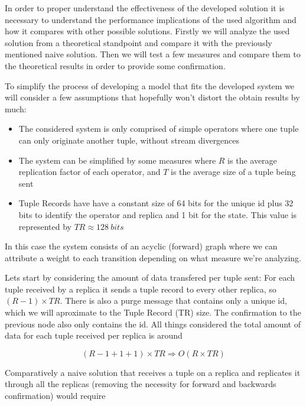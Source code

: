 \documentclass[times, 10pt,twocolumn]{article}
\begin{document}

In order to proper understand the effectiveness of the developed solution
it is necessary to understand the performance implications of the used
algorithm and how it compares with other possible solutions. Firstly we
will analyze the used solution from a theoretical standpoint and compare
it with the previously mentioned naive solution. Then we will test a few measures
and compare them to the theoretical results in order to provide some
confirmation.


To simplify the process of developing a model that fits the developed
system we will consider a few assumptions that hopefully won't distort the
obtain results by much:
\begin{itemize}
	\item The considered system is only comprised of simple operators
		where one tuple can only originate another tuple, without stream
		divergences
	\item The system can be simplified by some measures where $R$ is the
		average replication factor of each operator, and $T$ is the average size
		of a tuple being sent
	\item Tuple Records have have a constant size of 64 bits for the unique id plus
		32 bits to identify the operator and replica and 1 bit for the state.
		This value is represented by $TR \approx 128\ bits$
\end{itemize}
In this case the system consists of an acyclic (forward) graph where we can attribute a
weight to each transition depending on what measure we're analyzing.

Lets start by considering the amount of data transfered per tuple sent:
For each tuple received by a replica it sends a tuple record to every
other replica, so $(R-1)\times TR$. There is also a purge message that
contains only a unique id, which we will aproximate to the Tuple Record
(TR) size. The confirmation to the previous node also only contains the
id. All things considered the total amount of data for each tuple received
per replica is around 

\[ (R - 1 + 1 + 1) \times TR \Rightarrow O(R \times TR) \]

Comparatively a naive solution that receives a tuple on a replica and
replicates it through all the replicas (removing the necessity for forward
and backwards confirmation) would require 
\end{document}
